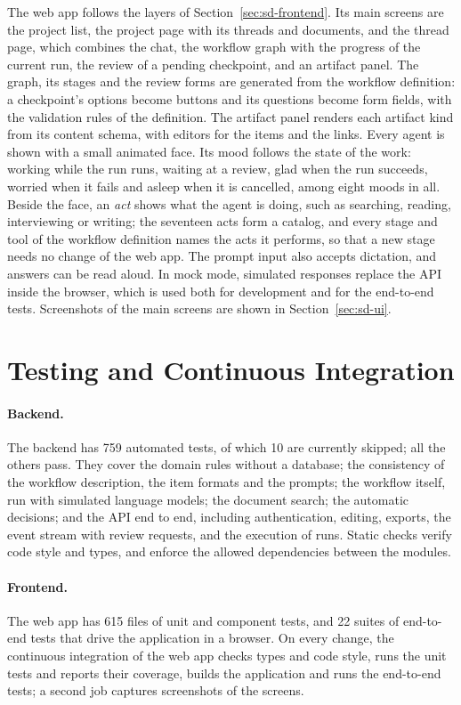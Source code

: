 The web app follows the layers of Section~\ref{sec:sd-frontend}. Its main screens are the project list, the project page with its threads and documents, and the thread page, which combines the chat, the workflow graph with the progress of the current run, the review of a pending checkpoint, and an artifact panel. The graph, its stages and the review forms are generated from the workflow definition: a checkpoint's options become buttons and its questions become form fields, with the validation rules of the definition. The artifact panel renders each artifact kind from its content schema, with editors for the items and the links. Every agent is shown with a small animated face. Its mood follows the state of the work: working while the run runs, waiting at a review, glad when the run succeeds, worried when it fails and asleep when it is cancelled, among eight moods in all. Beside the face, an \emph{act} shows what the agent is doing, such as searching, reading, interviewing or writing; the seventeen acts form a catalog, and every stage and tool of the workflow definition names the acts it performs, so that a new stage needs no change of the web app. The prompt input also accepts dictation, and answers can be read aloud. In mock mode, simulated responses replace the API inside the browser, which is used both for development and for the end-to-end tests. Screenshots of the main screens are shown in Section~\ref{sec:sd-ui}.

\section{Testing and Continuous Integration}
\label{sec:impl-testing}

\paragraph{Backend.} The backend has 759 automated tests, of which 10 are currently skipped; all the others pass. They cover the domain rules without a database; the consistency of the workflow description, the item formats and the prompts; the workflow itself, run with simulated language models; the document search; the automatic decisions; and the API end to end, including authentication, editing, exports, the event stream with review requests, and the execution of runs. Static checks verify code style and types, and enforce the allowed dependencies between the modules.

\paragraph{Frontend.} The web app has 615 files of unit and component tests, and 22 suites of end-to-end tests that drive the application in a browser. On every change, the continuous integration of the web app checks types and code style, runs the unit tests and reports their coverage, builds the application and runs the end-to-end tests; a second job captures screenshots of the screens.

